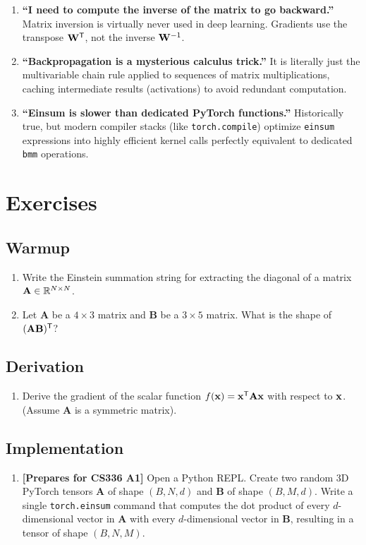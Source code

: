 \begin{enumerate}
  \item \textbf{``I need to compute the inverse of the matrix to go backward.''} Matrix inversion is virtually never used in deep learning. Gradients use the transpose $\mathbf{W}^{\mathsf{T}}$, not the inverse $\mathbf{W}^{-1}$.
  \item \textbf{``Backpropagation is a mysterious calculus trick.''} It is literally just the multivariable chain rule applied to sequences of matrix multiplications, caching intermediate results (activations) to avoid redundant computation.
  \item \textbf{``Einsum is slower than dedicated PyTorch functions.''} Historically true, but modern compiler stacks (like \texttt{torch.compile}) optimize \texttt{einsum} expressions into highly efficient kernel calls perfectly equivalent to dedicated \texttt{bmm} operations.
\end{enumerate}


\section{Exercises}
\label{ch:02:sec:exercises}

\subsection*{Warmup}
\begin{enumerate}
  \item Write the Einstein summation string for extracting the diagonal of a matrix $\mathbf{A} \in \mathbb{R}^{N \times N}$.
  \item Let $\mathbf{A}$ be a $4 \times 3$ matrix and $\mathbf{B}$ be a $3 \times 5$ matrix. What is the shape of $(\mathbf{AB})^{\mathsf{T}}$? 
\end{enumerate}

\subsection*{Derivation}
\begin{enumerate}
  \item Derive the gradient of the scalar function $f(\mathbf{x}) = \mathbf{x}^{\mathsf{T}} \mathbf{A} \mathbf{x}$ with respect to $\mathbf{x}$. (Assume $\mathbf{A}$ is a symmetric matrix).
\end{enumerate}

\subsection*{Implementation}
\begin{enumerate}
  \item \textbf{[Prepares for CS336 A1]} Open a Python REPL. Create two random 3D PyTorch tensors $\mathbf{A}$ of shape $(B, N, d)$ and $\mathbf{B}$ of shape $(B, M, d)$. Write a single \texttt{torch.einsum} command that computes the dot product of every $d$-dimensional vector in $\mathbf{A}$ with every $d$-dimensional vector in $\mathbf{B}$, resulting in a tensor of shape $(B, N, M)$.
\end{enumerate}

